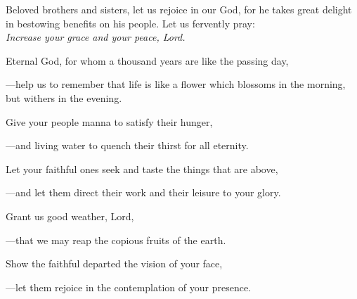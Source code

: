 \intercessions\indent

\begin{hangpar}

Beloved brothers and sisters, let us rejoice in our God, for he takes great delight in bestowing benefits on his people. Let us fervently pray:\\
\emph{Increase your grace and your peace, Lord.}

\medskip Eternal God, for whom a thousand years are like the passing day,

{\color{red}---\thinspace}help us to remember that life is like a flower which blossoms in the morning, but withers in the evening.

\medskip Give your people manna to satisfy their hunger,

{\color{red}---\thinspace}and living water to quench their thirst for all eternity.

\medskip Let your faithful ones seek and taste the things that are above,

{\color{red}---\thinspace}and let them direct their work and their leisure to your glory.

\medskip Grant us good weather, Lord,

{\color{red}---\thinspace}that we may reap the copious fruits of the earth.

\medskip Show the faithful departed the vision of your face,

{\color{red}---\thinspace}let them rejoice in the contemplation of your presence.

\end{hangpar}

